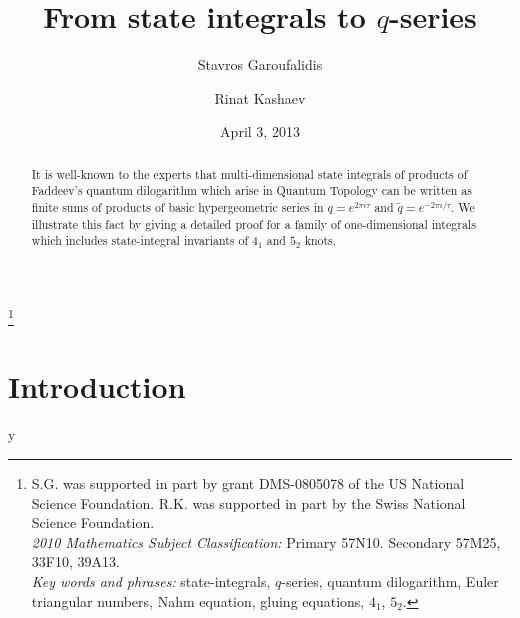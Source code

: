 \documentclass[12pt]{amsart}
\theoremstyle{definition}
\def\printname#1{
        \if\draft y
                \smash{\makebox[0pt]{\hspace{-0.5in}
                        \raisebox{8pt}{\tt\tiny #1}}}
        \fi
}
\def\lbl#1{\label{#1}\printname{#1}}
\def\tq{\tilde{q}}
\begin{document}
\title[From state integrals to $q$-series]{From state integrals to $q$-series}
\author{Stavros Garoufalidis}
\address{School of Mathematics \\
         Georgia Institute of Technology \\
         Atlanta, GA 30332-0160, USA \newline
         {\tt \url{http://www.math.gatech.edu/~stavros}}}
\author{Rinat Kashaev}
\address{Section de Math\'ematiques, Universit\'e de Gen\`eve \\
2-4 rue du Li\`evre, Case Postale 64, 1211 Gen\`eve 4, Switzerland \newline
         {\tt \url{http://www.unige.ch/math/folks/kashaev}}}
\thanks{%
S.G. was supported in part by grant DMS-0805078 of the US National Science 
Foundation. R.K. was supported in part by the Swiss National Science Foundation.
\bigskip\\
{\em 2010 Mathematics Subject Classification:}
  Primary 57N10. Secondary 57M25, 33F10, 39A13.\\
{\em Key words and phrases:}
state-integrals, $q$-series, quantum dilogarithm, Euler triangular numbers,
Nahm equation, gluing equations, $4_1$, $5_2$.
}

\date{April 3, 2013}%

\begin{abstract}
It is well-known to the experts that multi-dimensional state integrals 
of products of Faddeev's quantum dilogarithm which arise in Quantum Topology 
can be written as finite sums of products of basic hypergeometric series in 
$q=e^{2\pi i\tau}$ and $\tq=e^{-2\pi i/\tau}$. We illustrate this fact by giving
a detailed proof for a family of one-dimensional integrals which 
includes state-integral invariants of  $4_1$ and $5_2$ knots.
\end{abstract}

\maketitle

\tableofcontents


\section{Introduction}
\lbl{sec.intro}
\end{document}

